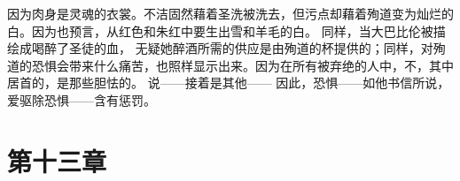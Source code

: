 因为肉身是灵魂的衣裳。不洁固然藉着圣洗被洗去，但污点却藉着殉道变为灿烂的白。因为也预言，从红色和朱红中要生出雪和羊毛的白。 同样，当大巴比伦被描绘成喝醉了圣徒的血， 无疑她醉酒所需的供应是由殉道的杯提供的；同样，对殉道的恐惧会带来什么痛苦，也照样显示出来。因为在所有被弃绝的人中，不，其中居首的，是那些胆怯的。 说——接着是其他——  因此，恐惧——如他书信所说，爱驱除恐惧——含有惩罚。\par


\section{第十三章}

